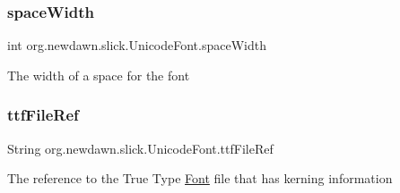 \subsubsection{\texorpdfstring{space\+Width}{spaceWidth}}
{\footnotesize\ttfamily int org.\+newdawn.\+slick.\+Unicode\+Font.\+space\+Width\hspace{0.3cm}{\ttfamily [private]}}

The width of a space for the font \mbox{\label{classorg_1_1newdawn_1_1slick_1_1_unicode_font_a2f13dde71bdabcab77c49030a4af17f2}} 
\subsubsection{\texorpdfstring{ttf\+File\+Ref}{ttfFileRef}}
{\footnotesize\ttfamily String org.\+newdawn.\+slick.\+Unicode\+Font.\+ttf\+File\+Ref\hspace{0.3cm}{\ttfamily [private]}}

The reference to the True Type \mbox{\hyperlink{interfaceorg_1_1newdawn_1_1slick_1_1_font}{Font}} file that has kerning information 